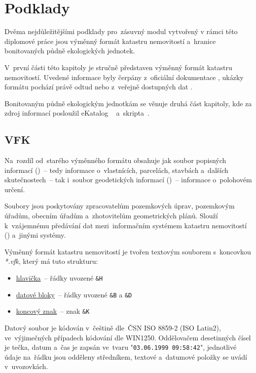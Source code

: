 \chapter{Podklady}
\label{podklady}

Dvěma nejdůležitějšími podklady pro~zásuvný modul vytvořený v rámci
této diplomové práce jsou výměnný formát katastru nemovitostí
a~hranice bonitovaných půdně ekologických jednotek.

V~první části této kapitoly je stručně představen výměnný formát
katastru nemo\-vitostí. Uvedené informace byly čerpány z~oficiální
dokumentace \citep{struktura_vfk}, ukázky formátu pochází právě odtud
nebo z~veřejně dostupných dat \citep{zdroj_vfk}.

Bonitovaným půdně ekologickým jednotkám se věnuje druhá část kapitoly,
kde za zdroj informací posloužil eKatalog ~\citep{vumop_bpej}
a~skripta~\citep{pu_skripta}.

\section{VFK}
\label{vfk}

Na~rozdíl od~starého výměnného formátu obsahuje  jak soubor
popisných informací ()~– tedy informace o~vlastnících,
parcelách, stavbách a~dalších skutečnostech~– tak i~soubor
geodetických informací ()~– informace o~polohovém určení.

Soubory  jsou poskytovány zpracovatelům pozemkových úprav,
pozemko\-vým úřadům, obecním úřadům a~zhotovitelům geometrických
plánů. Slouží k~vzájemnému předávání dat mezi~informačním systémem
katastru nemovitostí () a~jiný\-mi systémy.

Výměnný formát katastru nemovitostí je tvořen textovým souborem
s~koncovkou \textit{*.vfk}, který má tuto strukturu:
	\begin{itemize}[leftmargin=1.5cm, noitemsep]
		\item \underline{hlavička}~– řádky uvozené
\texttt{\&H}
		\item \underline{datové bloky}~– řádky uvozené
\texttt{\&B} a \texttt{\&D}
		\item \underline{koncový znak}~– znak \texttt{\&K}
	\end{itemize}

Datový soubor je kódován v~češtině dle~ČSN ISO 8859-2 (ISO Latin2),
ve~výjimeč\-ných případech kódování dle WIN1250. Oddělovačem
desetinných čísel je tečka, datum a~čas je zapsán ve~tvaru
"\texttt{03.06.1999 09:58:42}", jednotlivé údaje na~řádku jsou
odděleny středníkem, textové a~datumové položky se uvádí v~uvozovkách.

